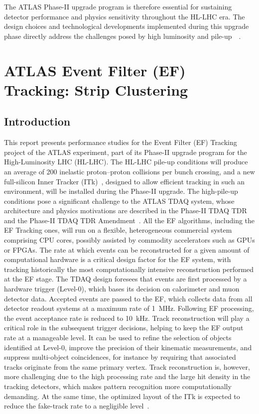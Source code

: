 The ATLAS Phase-II upgrade program is therefore essential for sustaining detector performance and physics sensitivity throughout the HL-LHC era. The design choices and technological developments implemented during this upgrade phase directly address the challenges posed by high luminosity and pile-up~\cite{HLLHCTDR}~\cite{ATLASPhaseIITDR}.


\chapter{ATLAS Event Filter (EF) Tracking: Strip Clustering}
\section{Introduction}

This report presents performance studies for the Event Filter (EF) Tracking project of the ATLAS experiment, part of its Phase-II upgrade program for the High-Luminosity LHC (HL-LHC). The HL-LHC pile-up conditions will produce an average of 200 inelastic proton--proton collisions per bunch crossing, and a new full-silicon Inner Tracker (ITk)~\cite{itk_strip_tdr, itk_pixel_tdr}, designed to allow efficient tracking in such an environment, will be installed during the Phase-II upgrade. The high-pile-up conditions pose a significant challenge to the ATLAS TDAQ system, whose architecture and physics motivations are described in the Phase-II TDAQ TDR~\cite{tdaq_tdr} and the Phase-II TDAQ TDR Amendment~\cite{tdaq_tdr_amend}. All the EF algorithms, including the EF Tracking ones, will run on a flexible, heterogeneous commercial system comprising CPU cores, possibly assisted by commodity accelerators such as GPUs or FPGAs. The rate at which events can be reconstructed for a given amount of computational hardware is a critical design factor for the EF system, with tracking historically the most computationally intensive reconstruction performed at the EF stage. The TDAQ design foresees that events are first processed by a hardware trigger (Level-0), which bases its decision on calorimeter and muon detector data. Accepted events are passed to the EF, which collects data from all detector readout systems at a maximum rate of 1~MHz. Following EF processing, the event acceptance rate is reduced to 10~kHz. Track reconstruction will play a critical role in the subsequent trigger decisions, helping to keep the EF output rate at a manageable level. It can be used to refine the selection of objects identified at Level-0, improve the precision of their kinematic measurements, and suppress multi-object coincidences, for instance by requiring that associated tracks originate from the same primary vertex. Track reconstruction is, however, more challenging due to the high processing rate and the large hit density in the tracking detectors, which makes pattern recognition more computationally demanding. At the same time, the optimized layout of the ITk is expected to reduce the fake-track rate to a negligible level~\cite{itk_strip_tdr, itk_pixel_tdr}.

